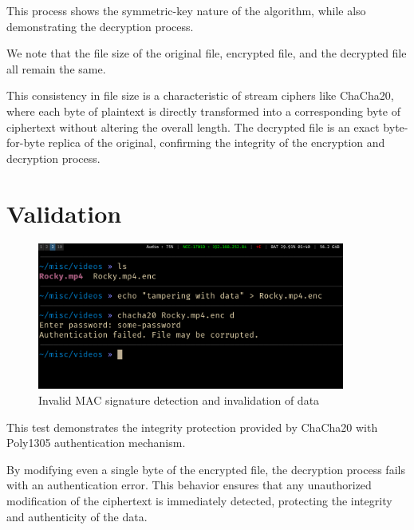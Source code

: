 \documentclass[a4paper,12pt]{report}
\begin{document}
This process shows the symmetric-key nature of the algorithm, while also demonstrating the decryption process.

We note that the file size of the original file, encrypted file, and the decrypted file all remain the same.

This consistency in file size is a characteristic of stream ciphers like ChaCha20, where each byte of plaintext is directly transformed into a corresponding byte of ciphertext without altering the overall length.
The decrypted file is an exact byte-for-byte replica of the original, confirming the integrity of the encryption and decryption process.

\section{Validation}
\begin{figure}[H]
	\centering
	\includegraphics[width=0.9\textwidth]{../assets/4_Poly-1305.png}
        \caption{Invalid MAC signature detection and invalidation of data}
	\label{image}
\end{figure}

This test demonstrates the integrity protection provided by ChaCha20 with Poly1305 authentication mechanism.

By modifying even a single byte of the encrypted file, the decryption process fails with an authentication error.
This behavior ensures that any unauthorized modification of the ciphertext is immediately detected, protecting the integrity and authenticity of the data.



\end{document}

